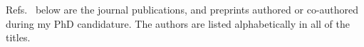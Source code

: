 \begin{publications}
 
  \begin{flushleft}
    Refs.~\cite{Bell:2020jou_sep_ImprovedTreatmentDark, Bell:2020lmm_mar_ImprovedTreatmentDark, Bell:2020obw_sep_NucleonStructureStrong, Bell:2021fye_oct_Improvedtreatmentdark, Anzuini:2021lnv_nov_Improvedtreatmentdark, Bell:2023ysh_dec_ThermalizationAnnihilationDark} below are the journal publications, and preprints
    authored or co-authored during my PhD candidature. The authors are listed
    alphabetically in all of the titles.
  \end{flushleft}

  \journalpaperlist
  \printbibliography[keyword = {my_paper},heading=none]
\end{publications}

